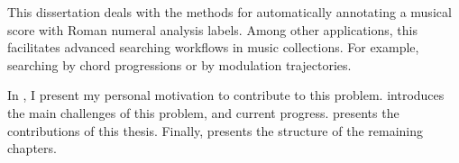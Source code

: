 

This dissertation deals with the methods for automatically
annotating a musical score with Roman numeral analysis
labels. Among other applications, this facilitates advanced
searching workflows in music collections. For example,
searching by chord progressions or by modulation
trajectories.


In , I present my personal motivation to
contribute to this problem.  introduces
the main challenges of this problem, and current progress.
 presents the
contributions of this thesis. Finally,
 presents the structure of the
remaining chapters.

